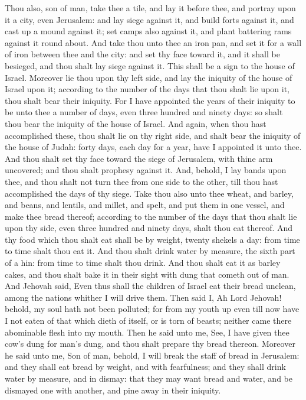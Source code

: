 Thou also, son of man, take thee a tile, and lay it before thee, and portray upon it a city, even Jerusalem: and lay siege against it, and build forts against it, and cast up a mound against it; set camps also against it, and plant battering rams against it round about. And take thou unto thee an iron pan, and set it for a wall of iron between thee and the city: and set thy face toward it, and it shall be besieged, and thou shalt lay siege against it. This shall be a sign to the house of Israel.  Moreover lie thou upon thy left side, and lay the iniquity of the house of Israel upon it; according to the number of the days that thou shalt lie upon it, thou shalt bear their iniquity. For I have appointed the years of their iniquity to be unto thee a number of days, even three hundred and ninety days: so shalt thou bear the iniquity of the house of Israel. And again, when thou hast accomplished these, thou shalt lie on thy right side, and shalt bear the iniquity of the house of Judah: forty days, each day for a year, have I appointed it unto thee. And thou shalt set thy face toward the siege of Jerusalem, with thine arm uncovered; and thou shalt prophesy against it. And, behold, I lay bands upon thee, and thou shalt not turn thee from one side to the other, till thou hast accomplished the days of thy siege.  Take thou also unto thee wheat, and barley, and beans, and lentils, and millet, and spelt, and put them in one vessel, and make thee bread thereof; according to the number of the days that thou shalt lie upon thy side, even three hundred and ninety days, shalt thou eat thereof. And thy food which thou shalt eat shall be by weight, twenty shekels a day: from time to time shalt thou eat it. And thou shalt drink water by measure, the sixth part of a hin: from time to time shalt thou drink. And thou shalt eat it as barley cakes, and thou shalt bake it in their sight with dung that cometh out of man. And Jehovah said, Even thus shall the children of Israel eat their bread unclean, among the nations whither I will drive them. Then said I, Ah Lord Jehovah! behold, my soul hath not been polluted; for from my youth up even till now have I not eaten of that which dieth of itself, or is torn of beasts; neither came there abominable flesh into my mouth. Then he said unto me, See, I have given thee cow’s dung for man’s dung, and thou shalt prepare thy bread thereon. Moreover he said unto me, Son of man, behold, I will break the staff of bread in Jerusalem: and they shall eat bread by weight, and with fearfulness; and they shall drink water by measure, and in dismay: that they may want bread and water, and be dismayed one with another, and pine away in their iniquity. 

